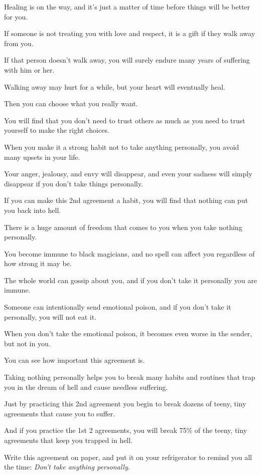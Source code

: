\documentclass{article}
\numberwithin{equation}{section}
\begin{document}
Healing is on the way, and it's just a matter of time before things will be better for you.

%
If someone is not treating you with love and respect, it is a gift if they walk away from you.

If that person doesn't walk away, you will surely endure many years of suffering with him or her.

Walking away may hurt for a while, but your heart will eventually heal.

Then you can choose what you really want.

You will find that you don't need to trust others as much as you need to trust yourself to make the right choices.

%
When you make it a strong habit not to take anything personally, you avoid many upsets in your life.

Your anger, jealousy, and envy will disappear, and even your sadness will simply disappear if you don't take things personally.

%
If you can make this 2nd agreement a habit, you will find that nothing can put you back into hell.

There is a huge amount of freedom that comes to you when you take nothing personally.

You become immune to black magicians, and no spell can affect you regardless of how strong it may be.

The whole world can gossip about you, and if you don't take it personally you are immune.

Someone can intentionally send emotional poison, and if you don't take it personally, you will not eat it.

When you don't take the emotional poison, it becomes even worse in the sender, but not in you.

%
You can see how important this agreement is.

Taking nothing personally helps you to break many habits and routines that trap you in the dream of hell and cause needless suffering.

Just by practicing this 2nd agreement you begin to break dozens of teeny, tiny agreements that cause you to suffer.

And if you practice the 1st 2 agreements, you will break 75\% of the teeny, tiny agreements that keep you trapped in hell.

%
Write this agreement on paper, and put it on your refrigerator to remind you all the time: \textit{Don't take anything personally}.
\end{document}
